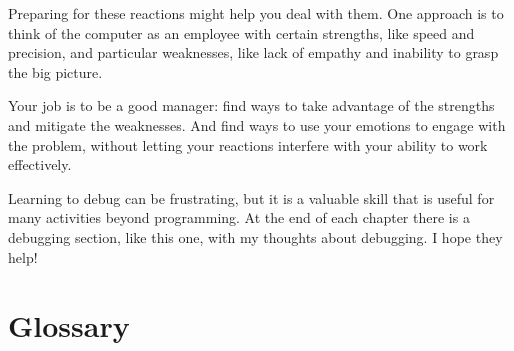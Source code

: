 \documentclass[10pt]{book}
\begin{document}

Preparing for these reactions might help you deal with them. One approach is to think of the computer as an employee 
with certain strengths, like speed and precision, and particular weaknesses, like lack of empathy and inability to 
grasp the big picture.

Your job is to be a good manager: find ways to take advantage of the strengths and mitigate the weaknesses.  And 
find ways to use your emotions to engage with the problem, without letting your reactions interfere with your 
ability to work effectively.

Learning to debug can be frustrating, but it is a valuable skill that is useful for many activities beyond 
programming.  At the end of each chapter there is a debugging section, like this one, with my thoughts about 
debugging.  I hope they help!


\section{Glossary}
\end{document}

